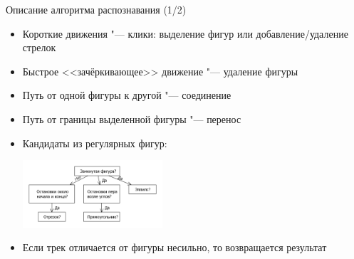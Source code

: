 \documentclass[utf8,xcolor=table]{beamer}
\begin{document}
\begin{frame}[t]{Описание алгоритма распознавания (1/2)}
  \begin{itemize}
  \item Короткие движения "--- клики: выделение фигур или добавление/удаление стрелок
  \item Быстрое <<зачёркивающее>> движение "--- удаление фигуры
  \item Путь от одной фигуры к другой "--- соединение
  \item Путь от границы выделенной фигуры "--- перенос
  \item Кандидаты из регулярных фигур:
    \begin{center}
      \includegraphics[height=2.5cm]{algo_cand}
    \end{center}
  \item Если трек отличается от фигуры несильно, то возвращается результат
  \end{itemize}
\end{frame}
\end{document}

